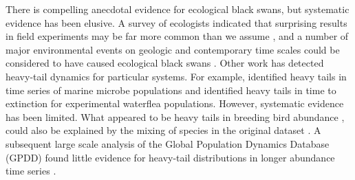 There is compelling anecdotal evidence for ecological black swans, but
systematic evidence has been elusive. A survey of ecologists indicated that
surprising results in field experiments may be far more common than we assume
\citep{doak2008}, and a number of major environmental events on geologic and
contemporary time scales could be considered to have caused ecological black
swans \citep{nunez2012}. Other work has detected heavy-tail dynamics for
particular systems. For example, \citet{segura2013} identified heavy tails in
time series of marine microbe populations and \citet{drake2014} identified
heavy tails in time to extinction for experimental waterflea populations.
However, systematic evidence has been limited. What appeared to be heavy tails
in breeding bird abundance \citep{keitt1998}, could also be explained by the
mixing of species in the original dataset \citep{allen2001}. A subsequent
large scale analysis of the Global Population Dynamics Database (GPDD) found
little evidence for heavy-tail distributions in longer abundance time series
\citet{halley2002}.




